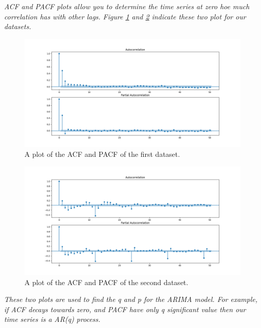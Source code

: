 \textit{\gls{ACF}  and \gls{PACF} plots allow you to determine the time series at zero hoe much correlation has with other lags. Figure \ref{fig:Ass1_D1_PACF_ACF} and \ref{fig:Ass1_D2_PACF_ACF} indicate these two plot for our datasets.}



\begin{figure}[H]
    \centering
    \begin{minipage}[b]{1\textwidth}
        \includegraphics[width=\textwidth]{figures/Ass1/Ass1_D1_PACF_ACF.png}
    \end{minipage}
    \caption{A plot of the \gls{ACF} and \gls{PACF} of the first dataset.}
    \label{fig:Ass1_D1_PACF_ACF}
\end{figure}

\begin{figure}[H]
    \centering
    \begin{minipage}[b]{1\textwidth}
        \includegraphics[width=\textwidth]{figures/Ass1/Ass1_D2_PACF_ACF.png}
    \end{minipage}
    \caption{A plot of the \gls{ACF} and \gls{PACF} of the second dataset.}
    \label{fig:Ass1_D2_PACF_ACF}
\end{figure}


\textit{These two plots are used to find the q and p for the ARIMA model. For example, if \gls{ACF} decays towards zero, and \gls{PACF} have only q significant value then our time series is a AR(q) process.}

